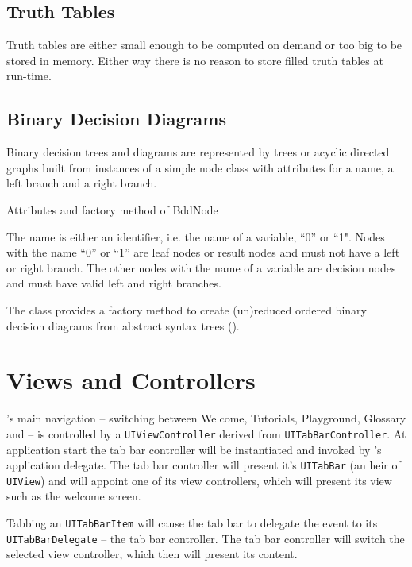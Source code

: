 \subsection{Truth Tables}

Truth tables are either small enough to be computed on demand or too big to be stored in memory.
Either way there is no reason to store filled truth tables at run-time.

\subsection{Binary Decision Diagrams}

Binary decision trees and diagrams are represented by trees 
or acyclic directed graphs built from instances of a simple node class
 with attributes for a name, a left branch and a right branch. 
\begin{table}[htdp]
\begin{center}
\caption{Attributes and factory method of BddNode}
\label{fig:BddNode}
\end{center}
\end{table}
The name is either an identifier, i.e. the name of a variable, “0” or “1". 
Nodes with the name “0” or “1” are leaf nodes or result nodes
and must not have a left or right branch.
The other nodes with the name of a variable are decision nodes 
and must have valid left and right branches. 

The class provides a factory method to create 
(un)reduced ordered binary decision diagrams from abstract syntax trees
().

\newpage
\section{Views and Controllers}

\Nyaya's main navigation – switching between Welcome, Tutorials, Playground, Glossary and \BoolTool – 
is controlled by a \verb+UIViewController+ derived from \verb+UITabBarController+. 
At application start the tab bar controller will be instantiated and invoked by \Nyaya's application delegate. 
The tab bar controller will present it's \verb+UITabBar+ (an heir of \verb+UIView+)
and will appoint one of its view controllers, which will present its view such as the welcome screen.

Tabbing an \verb+UITabBarItem+ will cause the tab bar to delegate the event to its \verb+UITabBarDelegate+ – the tab bar controller.
The tab bar controller will switch the selected view controller, which then will present its content.

